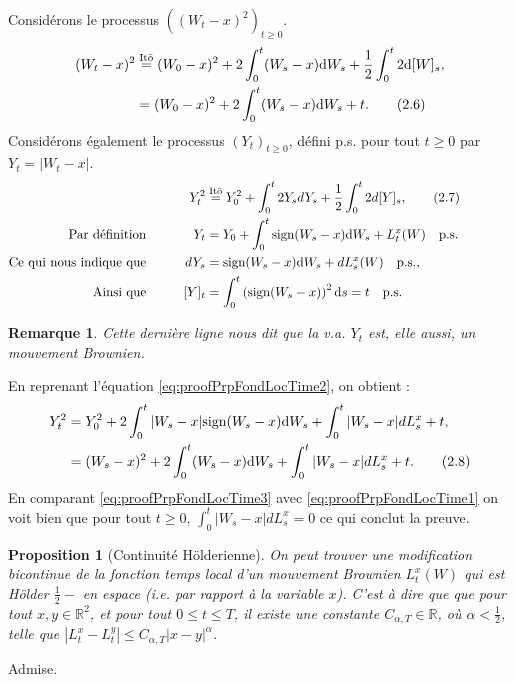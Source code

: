 \documentclass[openany]{book}
\makeatletter
\newcommand{\R}{\mathbb{R}}
\newcommand{\1}{\mathbbm{1}}
\newcommand{\sign}{\text{sign}}
\renewcommand{\d}{\mathrm{d}}
\renewenvironment{proof}[1][\textbf{\textit{Démonstration}}]{%
  \par\pushQED{\qed}%
  \normalfont\topsep6\p@\@plus6\p@\relax
  \trivlist\item[\hskip\labelsep
    #1\@addpunct{.}]\ignorespaces
}{%
  \popQED\endtrivlist\@endpefalse
}
\theoremstyle{thmfont}
\theoremstyle{deffont}
\theoremstyle{thmfont}
\newtheorem{prop}[prop]{Proposition}
\theoremstyle{deffont}
\newtheorem{remark}[remark]{Remarque}
\makeatother
\begin{document}
\begin{proof}
    Considérons le processus $\left((W_t - x)^2\right)_{t\geq0}$.
    \begin{align*}
      (W_t -x)^2 &\overset{\text{Itō}}{=} (W_0-x)^2 + 2\int_0^t (W_s -x)\d W_s + \dfrac{1}{2} \int_0^t 2 \d [W]_s,\\
                 &= (W_0-x)^2 + 2\int_0^t (W_s -x)\d W_s + t.  \tag{2.6}\refstepcounter{equation} \label{eq:proofPrpFondLocTime1}
    \end{align*}
    \indent Considérons également le processus $(Y_t)_{t\geq0}$, défini p.s. pour tout $t\geq0$ par $Y_t = |W_t-x|$.
    \begin{alignat*}{2}
     && Y_t^2 &\overset{\text{Itō}}{=} Y_0^2 + \int_0^t 2Y_s dY_s + \dfrac{1}{2} \int_0^t 2 d[Y]_s,  \tag{2.7}\refstepcounter{equation}\label{eq:proofPrpFondLocTime2} \\
     \text{Par définition}&&\qquad Y_t &= Y_0 + \int_0^t \sign(W_s -x) \d W_s + L_t^x(W)\quad\text{p.s.}\\
      \text{Ce qui nous indique que}&&\qquad dY_s &=  \sign(W_s -x) \d W_s + dL_s^x(W) \quad\text{p.s.},\qquad\qquad\qquad\quad\\
     \text{Ainsi que}&& [Y]_t &= \int_0^t \left(\sign(W_s-x)\right)^2 \d s = t \quad\text{p.s.}\\
    \end{alignat*}
    \begin{remark}Cette dernière ligne nous dit que la v.a. $Y_t$ est, elle aussi, un mouvement Brownien.
    \end{remark}
    

    \noindent En reprenant l’équation \eqref{eq:proofPrpFondLocTime2}, on obtient :
    \begin{align*}
      Y_t^2 &= Y_0^2 + 2\int_0^t |W_s - x| \sign(W_s-x) \d W_s + \int_0^t |W_s-x| dL_s^x + t,\\
      &= (W_s -x)^2 + 2\int_0^t (W_s -x) \d W_s + \int_0^t |W_s -x| dL_s^x + t. \tag{2.8}\refstepcounter{equation}\label{eq:proofPrpFondLocTime3}
    \end{align*}
    En comparant \eqref{eq:proofPrpFondLocTime3} avec \eqref{eq:proofPrpFondLocTime1} on voit bien que pour tout $t\geq0$, $\int_0^t |W_s-x|dL_s^x = 0$ ce qui conclut la preuve.
\end{proof}


  \begin{prop}[Continuité Hölderienne]
    On peut trouver une modification bicontinue de la fonction temps local d'un mouvement Brownien $L_t^x(W)$ qui est Hölder $\frac{1}{2}-$ en espace (i.e. par rapport à la variable $x$). C'est à dire que que pour tout $x, y \in\R^2$, et pour tout $0\leq t \leq T$, il existe une constante $C_{\alpha,T} \in \R$, où $\alpha < \frac{1}{2}$, telle que $|L_t^x - L_t^y|\leq C_{\alpha,T}|x - y|^\alpha$.
  \end{prop}
  \begin{proof}
    Admise.
\end{proof}
\end{document}
